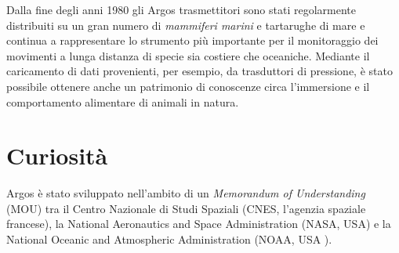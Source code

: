 \documentclass[12pt,a4paper]{article}
\begin{document}
Dalla fine degli anni 1980 gli Argos trasmettitori sono stati regolarmente distribuiti su un gran numero di \emph{mammiferi marini} e tartarughe di mare e continua a rappresentare lo strumento più importante per il monitoraggio dei movimenti a lunga distanza di specie sia costiere che oceaniche. Mediante il caricamento di dati provenienti, per esempio, da trasduttori di pressione, è stato possibile ottenere anche un patrimonio di conoscenze circa l'immersione e il comportamento alimentare di animali in natura.

\section*{Curiosità}
\label{curiosit}

Argos è stato sviluppato nell'ambito di un \emph{Memorandum of Understanding} (MOU) tra il Centro Nazionale di Studi Spaziali (CNES, l'agenzia spaziale francese), la National Aeronautics and Space Administration (NASA, USA) e la National Oceanic and Atmospheric Administration (NOAA, USA ).
\end{document}
